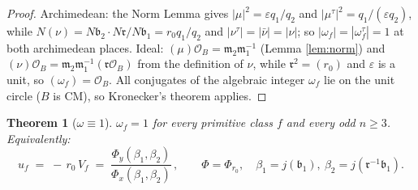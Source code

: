 \documentclass[11pt]{amsart}
\numberwithin{equation}{section}
\theoremstyle{plain}
\newtheorem{theorem}{Theorem}[section]
\theoremstyle{definition}
\theoremstyle{remark}
\newcommand{\idealb}{\mathfrak{b}}
\newcommand{\idealm}{\mathfrak{m}}
\newcommand{\idealr}{\mathfrak{r}}
\begin{document}
\begin{proof}
Archimedean: the Norm Lemma gives $|\mu|^2 = \varepsilon q_1/q_2$ and
$|\mu^{\tau}|^2 = q_1/(\varepsilon q_2)$, while $N(\nu) =
N\idealb_2\cdot N\idealr/N\idealb_1 = r_0q_1/q_2$ and $|\nu^{\tau}| =
|\bar\nu| = |\nu|$; so $|\omega_f| = |\omega_f^{\tau}| = 1$ at both
archimedean places.  Ideal: $(\mu)\mathcal{O}_B = \idealm_2
\idealm_1^{-1}$ (Lemma \ref{lem:norm}) and $(\nu)\mathcal{O}_B =
\idealm_2\idealm_1^{-1}(\idealr\mathcal{O}_B)$ from the definition of
$\nu$, while $\idealr^2 = (r_0)$ and $\varepsilon$ is a unit, so
$(\omega_f) = \mathcal{O}_B$.  All conjugates of the algebraic integer
$\omega_f$ lie on the unit circle ($B$ is CM), so Kronecker's theorem
applies.
\end{proof}

\begin{theorem}[$\omega \equiv 1$]\label{thm:omega1}
$\omega_f = 1$ for every primitive class $f$ and every odd $n \ge 3$.
Equivalently:
\[
  \boxed{\;u_f \;=\; -\,r_0\,V_f \;=\;
  \frac{\Phi_y(\beta_1, \beta_2)}{\Phi_x(\beta_1, \beta_2)}\,,
  \qquad
  \Phi = \Phi_{r_0},\quad
  \beta_1 = j(\idealb_1),\ \beta_2 = j(\idealr^{-1}\idealb_1). \;}
\]
\end{theorem}
\end{document}
